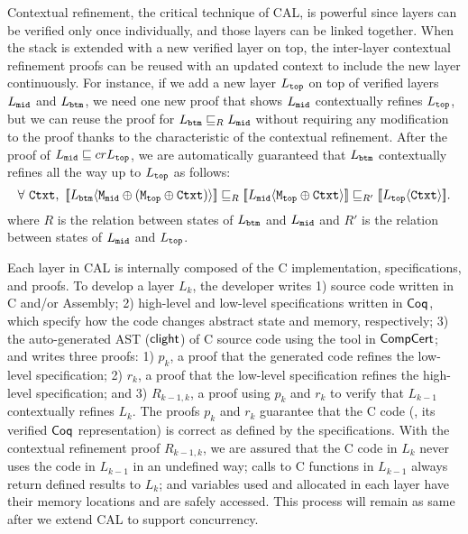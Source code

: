 Contextual refinement, the critical technique of CAL, is powerful since layers can be verified only once individually, and those layers can be linked together.
 When the stack is extended with a new verified layer on top, 
 the inter-layer contextual refinement proofs can be reused with an updated context to include the new layer continuously. 
For instance, if we add a new layer $L_{{\mathrm{\texttt{top}}}}$ on top of verified layers $L_{{\mathrm{\texttt{mid}}}}$ and $L_{{\mathrm{\texttt{btm}}}}$, 
we need one new proof that shows $L_{{\mathrm{\texttt{mid}}}}$ contextually refines $L_{{\mathrm{\texttt{top}}}}$, but we can reuse the proof for $L_{{\mathrm{\texttt{btm}}}} \sqsubseteq_{R} L_{{\mathrm{\texttt{mid}}}}$ without requiring any modification to the proof thanks to the characteristic of the contextual refinement. After the proof of $L_{{\mathrm{\texttt{mid}}}} \sqsubseteq{cr} L_{{\mathrm{\texttt{top}}}}$, we are automatically guaranteed that $L_{{\mathrm{\texttt{btm}}}}$ contextually refines all the way up to $L_{{\mathrm{\texttt{top}}}}$ as follows:
$$
\forall\ \codeinmath{Ctxt},\ \sem{L_{\codeinmath{btm}}}{\codeinmath{M}_{\codeinmath{mid}}\oplus (\codeinmath{M}_{\codeinmath{top}}\oplus \codeinmath{Ctxt})} \refines_{R}  \sem{L_{\codeinmath{mid}}}{\codeinmath{M}_{\codeinmath{top}} \oplus \codeinmath{Ctxt}} \refines_{R'} \sem{L_{\codeinmath{top}}}{\codeinmath{Ctxt}}. 
$$ 
where $R$ is the relation between states of $ L_{{\mathrm{\texttt{btm}}}}$ and $L_{{\mathrm{\texttt{mid}}}}$ and $R'$ is the relation between states of 
 $ L_{{\mathrm{\texttt{mid}}}}$ and $L_{{\mathrm{\texttt{top}}}}$.


Each layer in CAL is internally composed of the C implementation, specifications, and proofs.
To develop a layer $L_k$, 
the developer writes 
1) source code written in C and/or Assembly; 
2) high-level and  low-level specifications written in $\mathsf{Coq}$, which specify how the code changes abstract state and memory, respectively; 
3) the auto-generated AST ($\mathsf{clight}$) of C source code using the tool in $\mathsf{CompCert}$; 
and writes three proofs: 
1) $p_k$, a proof that the generated code refines the low-level specification; 
2) $r_k$, a proof that the low-level specification refines the high-level specification; and 
3) $R_{k-1,k}$, a proof using $p_k$ and $r_k$ to verify that $L_{k-1}$ contextually refines $L_{k}$. 
The proofs $p_k$ and $r_k$ guarantee that the C code (\ie , its verified $\mathsf{Coq}$ representation) is correct as defined by the specifications.
 With the contextual refinement proof $R_{k-1, k}$, we are assured that the C code in $L_k$ never uses the code in $L_{k-1}$ in an undefined way; 
 calls to C functions in $L_{k-1}$ always return defined results to $L_k$; and variables 
 used and allocated in each layer have their memory locations and are safely accessed.
 This process will remain as same after we extend CAL to support concurrency.

